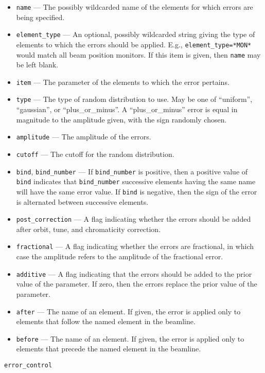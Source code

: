 \documentclass[11pt]{article}
\begin{document}
\begin{itemize}
\item \verb|name| --- The possibly wildcarded name of the elements for which errors are being specified.
\item \verb|element_type| --- An optional, possibly wildcarded string giving the type of elements to
 which the errors should be applied.  E.g., \verb|element_type=*MON*| would match all beam position monitors.
 If this item is given, then \verb|name| may be left blank.
\item \verb|item| --- The parameter of the elements to which the error pertains.
\item \verb|type| --- The type of random distribution to use.  May be one of ``uniform'', ``gaussian'', or ``plus\_or\_minus''.
A ``plus\_or\_minus'' error is equal in magnitude to the amplitude given, with the sign randomly chosen.
\item \verb|amplitude| --- The amplitude of the errors.
\item \verb|cutoff| --- The cutoff for the random distribution.
\item \verb|bind|, \verb|bind_number| --- If \verb|bind_number| is positive, then a positive value of \verb|bind|
indicates that \verb|bind_number| successive elements having the same name will have the same error value.  If
\verb|bind| is negative, then the sign of the error is alternated between successive elements.
\item \verb|post_correction| --- A flag indicating whether the errors should be added after orbit, tune, and chromaticity correction.
\item \verb|fractional| --- A flag indicating whether the errors are fractional, in which case the amplitude refers to
the amplitude of the fractional error.
\item \verb|additive| --- A flag indicating that the errors should be added to the prior value of the
parameter.  If zero, then the errors replace the prior value of the parameter.
\item \verb|after| --- The name of an element.  If given, the error is applied only to elements
 that follow the named element in the beamline.
\item \verb|before| --- The name of an element.  If given, the error is applied only to elements
 that precede the named element in the beamline.
\end{itemize}

\begin{latexonly}
\newpage
\begin{center}{\Large\verb|error_control|}\end{center}
\end{latexonly}
\end{document}
